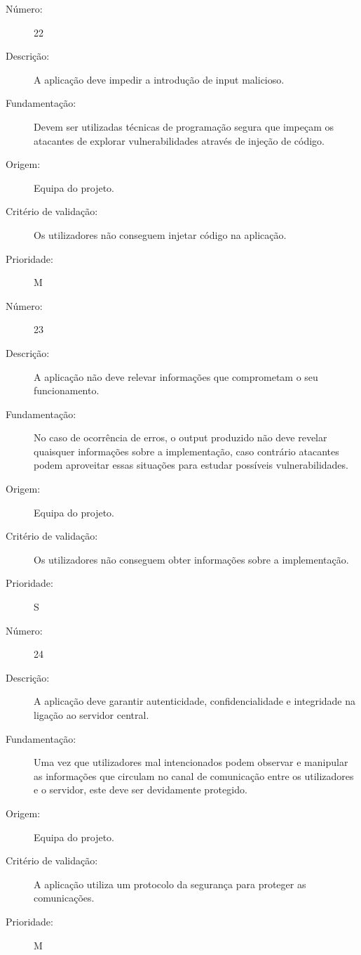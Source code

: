 \documentclass{article}
\begin{document}
            \begin{description}
        \item[Número:]22
        \item[Descrição:]A aplicação deve impedir a introdução de input malicioso.
        \item[Fundamentação:]Devem ser utilizadas técnicas de programação segura que impeçam os atacantes de explorar vulnerabilidades através de injeção de código.
        \item[Origem:]Equipa do projeto.
        \item[Critério de validação:]Os utilizadores não conseguem injetar código na aplicação.
        \item[Prioridade:]M
      \end{description}

      \vspace{0.5cm}

            \begin{description}
        \item[Número:]23
        \item[Descrição:]A aplicação não deve relevar informações que comprometam o seu funcionamento.
        \item[Fundamentação:]No caso de ocorrência de erros, o output produzido não deve revelar  quaisquer informações sobre a implementação, caso contrário atacantes podem aproveitar essas situações para estudar possíveis vulnerabilidades.
        \item[Origem:]Equipa do projeto.
        \item[Critério de validação:]Os utilizadores não conseguem obter informações sobre a implementação.
        \item[Prioridade:]S
      \end{description}
      \vspace{0.5cm}

            \begin{description}
        \item[Número:]24
        \item[Descrição:]A aplicação deve garantir autenticidade, confidencialidade e integridade na ligação ao servidor central.
        \item[Fundamentação:]Uma vez que utilizadores mal intencionados podem observar e manipular as informações que circulam no canal de comunicação entre os utilizadores e o servidor, este deve ser devidamente protegido.
        \item[Origem:] Equipa do projeto.
        \item[Critério de validação:]A aplicação utiliza um protocolo da segurança para proteger as comunicações.
        \item[Prioridade:]M
      \end{description}
\end{document}
